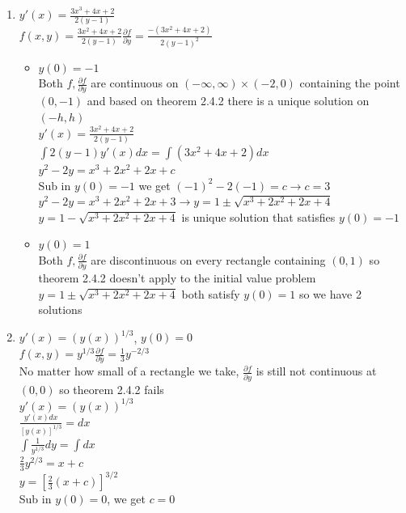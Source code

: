 \documentclass{article}
\begin{document}
\begin{enumerate}
    \item $y'(x)=\frac{3x^3+4x+2}{2(y-1)}$\\
    $f(x,y)=\frac{3x^2+4x+2}{2(y-1)}$\hspace*{0.5in}$\frac{\partial f}{\partial y}=\frac{-(3x^2+4x+2)}{2(y-1)^2}$
    \begin{itemize}
        \item $y(0)=-1$\\
        Both $f,\frac{\partial f}{\partial y}$ are continuous on $(-\infty,\infty)\times(-2,0)$ containing the point $(0,-1)$ and based on theorem 2.4.2 there is a unique solution on $(-h,h)$\\
        $y'(x)=\frac{3x^2+4x+2}{2(y-1)}$\\
        $\int 2(y-1)y'(x)dx=\int(3x^2+4x+2)dx$\\
        $y^2-2y=x^3+2x^2+2x+c$\\
        Sub in $y(0)=-1$ we get $(-1)^2-2(-1)=c\rightarrow c=3$\\
        $y^2-2y=x^3+2x^2+2x+3\rightarrow y=1\pm\sqrt{x^3+2x^2+2x+4}$\\
        $y=1-\sqrt{x^3+2x^2+2x+4}$ is unique solution that satisfies $y(0)=-1$
        \item $y(0)=1$\\
        Both $f,\frac{\partial f}{\partial y}$ are discontinuous on every rectangle containing $(0,1)$ so theorem 2.4.2 doesn't apply to the initial value problem\\
        $y=1\pm\sqrt{x^3+2x^2+2x+4}$ both satisfy $y(0)=1$ so we have 2 solutions
    \end{itemize}
    \item $y'(x)=(y(x))^{1/3}$, $y(0)=0$\\
    $f(x,y)=y^{1/3}$\hspace*{0.5in}$\frac{\partial f}{\partial y}=\frac{1}{3}y^{-2/3}$\\
    No matter how small of a rectangle we take, $\frac{\partial f}{\partial y}$ is still not continuous at $(0,0)$ so theorem 2.4.2 fails\\
    $y'(x)=(y(x))^{1/3}$\\
    $\frac{y'(x)dx}{[y(x)]^{1/3}}=dx$\\
    $\int\frac{1}{y^{1/3}}dy=\int dx$\\
    $\frac{2}{3}y^{2/3}=x+c$\\
    $y=[\frac{2}{3}(x+c)]^{3/2}$\\
    Sub in $y(0)=0$, we get $c=0$\\

\end{enumerate}
\end{document}
